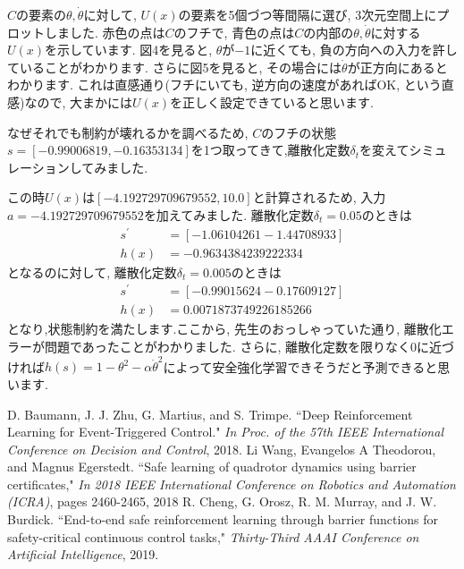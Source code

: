 \documentclass{jsarticle}
\begin{document}
$C$の要素の$\theta, \dot{\theta}$に対して, $U(x)$の要素を5個づつ等間隔に選び, 3次元空間上にプロットしました. 赤色の点は$C$のフチで, 青色の点は$C$の内部の$\theta, \dot{\theta}$に対する$U(x)$を示しています. 図4を見ると, $\theta$が$-1$に近くても, 負の方向への入力を許していることがわかります. さらに図5を見ると, その場合には$\dot{\theta}$が正方向にあるとわかります. これは直感通り(フチにいても, 逆方向の速度があればOK, という直感)なので, 大まかには$U(x)$を正しく設定できていると思います.\par
なぜそれでも制約が壊れるかを調べるため, $C$のフチの状態$s = [-0.99006819, -0.16353134]$を1つ取ってきて,離散化定数$\delta_t$を変えてシミュレーションしてみました. \par
この時$U(x)$は$[-4.192729709679552, 10.0]$と計算されるため, 入力$a = -4.192729709679552$を加えてみました. 離散化定数$\delta_t=0.05$のときは
\begin{align*}
	s^{\prime} &= [-1.06104261 -1.44708933] \\
	h(x) &= -0.9634384239222334
\end{align*}
となるのに対して, 離散化定数$\delta_t=0.005$のときは
\begin{align*}
	s^{\prime} &= [-0.99015624 -0.17609127] \\
	h(x) &= 0.0071873749226185266
\end{align*}
となり,状態制約を満たします.ここから, 先生のおっしゃっていた通り, 離散化エラーが問題であったことがわかりました. さらに, 離散化定数を限りなく0に近づければ$h(s) = 1- \theta^2- \alpha\dot{\theta}^2$によって安全強化学習できそうだと予測できると思います.

\begin{thebibliography}{10}
D. Baumann, J. J. Zhu, G. Martius, and S. Trimpe. “Deep Reinforcement Learning for Event-Triggered Control."  \textit{In Proc. of the 57th IEEE International Conference on Decision and Control}, 2018.
Li Wang, Evangelos A Theodorou, and Magnus Egerstedt. “Safe learning of quadrotor dynamics using barrier certificates," \textit{In 2018 IEEE International Conference on Robotics and Automation (ICRA)}, pages 2460-2465, 2018
R. Cheng, G. Orosz, R. M. Murray, and J. W. Burdick.  “End-to-end safe reinforcement learning through barrier functions for safety-critical continuous control tasks," \textit{Thirty-Third AAAI Conference on Artificial Intelligence}, 2019.

\end{thebibliography}

 
\end{document}

